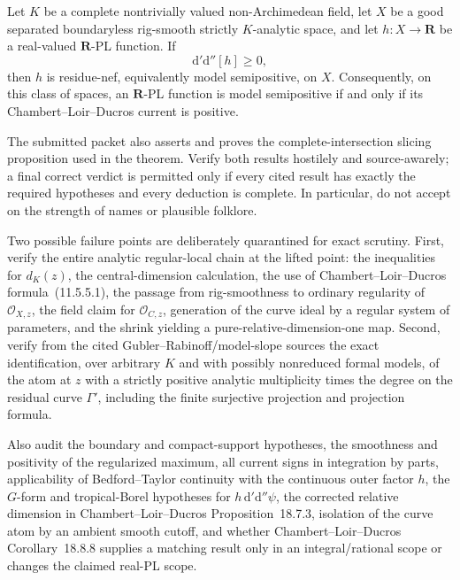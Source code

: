 \begin{theorem}
Let $K$ be a complete nontrivially valued non-Archimedean field, let $X$ be
a good separated boundaryless rig-smooth strictly $K$-analytic space, and
let $h:X\to\mathbf R$ be a real-valued $\mathbf R$-PL function.  If
\[
                         \mathrm d'\mathrm d''[h]\geq0,
\]
then $h$ is residue-nef, equivalently model semipositive, on $X$.
Consequently, on this class of spaces, an $\mathbf R$-PL function is model
semipositive if and only if its Chambert--Loir--Ducros current is positive.
\end{theorem}

The submitted packet also asserts and proves the complete-intersection
slicing proposition used in the theorem.  Verify both results hostilely and
source-awarely; a final correct verdict is permitted only if every cited
result has exactly the required hypotheses and every deduction is complete.
In particular, do not accept on the strength of names or plausible folklore.

Two possible failure points are deliberately quarantined for exact scrutiny.
First, verify the entire analytic regular-local chain at the lifted point:
the inequalities for $d_K(z)$, the central-dimension calculation, the use of
Chambert--Loir--Ducros formula~(11.5.5.1), the passage from rig-smoothness to
ordinary regularity of $\mathcal O_{X,z}$, the field claim for
$\mathcal O_{C,z}$, generation of the curve ideal by a regular system of
parameters, and the shrink yielding a pure-relative-dimension-one map.
Second, verify from the cited Gubler--Rabinoff/model-slope sources the exact
identification, over arbitrary $K$ and with possibly nonreduced formal
models, of the atom at $z$ with a strictly positive analytic multiplicity
times the degree on the residual curve $\Gamma'$, including the finite
surjective projection and projection formula.

Also audit the boundary and compact-support hypotheses, the smoothness and
positivity of the regularized maximum, all current signs in integration by
parts, applicability of Bedford--Taylor continuity with the continuous outer
factor $h$, the $G$-form and tropical-Borel hypotheses for
$h\,\mathrm d'\mathrm d''\psi$, the corrected relative dimension in
Chambert--Loir--Ducros Proposition~18.7.3, isolation of the curve atom by an
ambient smooth cutoff, and whether Chambert--Loir--Ducros
Corollary~18.8.8 supplies a matching result only in an integral/rational
scope or changes the claimed real-PL scope.
